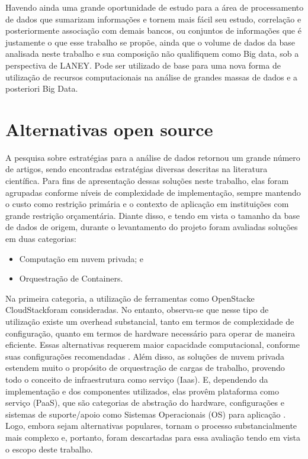 Havendo ainda uma grande oportunidade de estudo para a área de processamento de dados que sumarizam informações e tornem mais fácil seu estudo, correlação e posteriormente associação com demais bancos, ou conjuntos de informações que é justamente o que esse trabalho se propõe, ainda que o volume de dados da base analisada neste trabalho e sua composição não qualifiquem como Big data, sob a perspectiva de LANEY. Pode ser utilizado de base para uma nova forma de utilização de recursos computacionais na análise de grandes massas de dados e a posteriori Big Data. 

\section{Alternativas open source}

A pesquisa sobre estratégias para a análise de dados retornou um grande número de artigos, sendo encontradas estratégias diversas descritas na literatura científica.  Para fins de apresentação dessas soluções neste trabalho, elas foram agrupadas conforme níveis de complexidade de implementação, sempre mantendo o custo como restrição primária e o contexto de aplicação em instituições com grande restrição orçamentária.
Diante disso, e tendo em vista o tamanho da base de dados de origem, durante o levantamento do projeto foram avaliadas soluções em duas categorias:

\begin{itemize}
    \item Computação em nuvem privada; e
    \item Orquestração de Containers.
\end{itemize}

Na primeira categoria, a utilização de ferramentas como OpenStack\textregistered e CloudStack\textregistered foram consideradas. No entanto, observa-se que nesse tipo de utilização existe um overhead substancial, tanto em termos de complexidade de configuração, quanto em termos de hardware necessário para operar de maneira eficiente. Essas alternativas requerem maior capacidade computacional, conforme suas configurações recomendadas \cite{cloudstack,openstack}. Além disso, as soluções de nuvem privada estendem muito o propósito de orquestração de cargas de trabalho, provendo todo o conceito de infraestrutura como serviço (Iaas). E, dependendo da implementação e dos componentes utilizados, elas provêm plataforma como serviço (PaaS), que são categorias de abstração do hardware, configurações e sistemas de suporte/apoio como Sistemas Operacionais (OS) para aplicação \cite{openstack,cloudstack,mell_nist_2011}. Logo, embora sejam alternativas populares, tornam o processo substancialmente mais complexo e, portanto, foram descartadas para essa avaliação tendo em vista o escopo deste trabalho.

